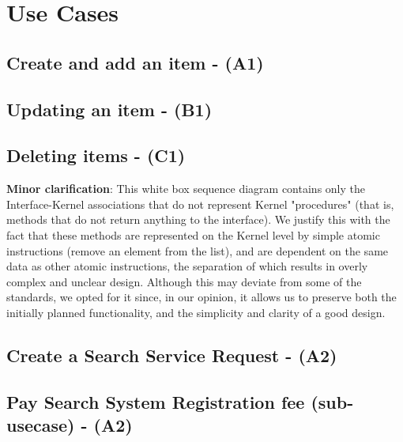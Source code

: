 \documentclass{article}
\begin{document}
\newpage


\newpage
\section{Use Cases}

\newpage
\subsection{Create and add an item - (A1)}


% 

\newpage
\subsection{Updating an item - (B1)}



\newpage
\subsection{Deleting items - (C1)}



\textbf{Minor clarification}: This white box sequence diagram contains only the Interface-Kernel associations that do not represent Kernel "procedures" (that is, methods that do not return anything to the interface). We justify this with the fact that these methods are represented on the Kernel level by simple atomic instructions (remove an element from the list), and are dependent on the same data as other atomic instructions, the separation of which results in overly complex and unclear design. Although this may deviate from some of the standards, we opted for it since, in our opinion, it allows us to preserve both the initially planned functionality, and the simplicity and clarity of a good design. 

\newpage
\subsection{Create a Search Service Request - (A2)}

\subsection{Pay Search System Registration fee (sub-usecase) - (A2)}

\end{document}
